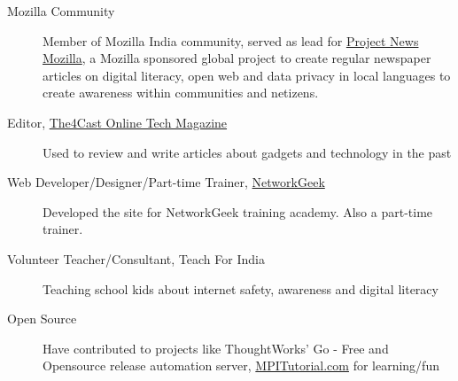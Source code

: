 \documentclass[letterpaper,11pt]{article}
\begin{document}
	\begin{description}
		\item[Mozilla Community] {\footnotesize Member of Mozilla India community, served as lead for \href{https://wiki.mozilla.org/NeMo}{Project News Mozilla}, a Mozilla sponsored global project to create regular newspaper articles on digital literacy, open web and data privacy in local languages to create awareness within communities and netizens. }
		\item[Editor, \href{http://www.the4cast.com/author/dwarak}{The4Cast Online Tech Magazine}] {\footnotesize Used to review and write articles about gadgets and technology in the past}
		\item[Web Developer/Designer/Part-time Trainer, \href{https://www.networkgeek.in/}{NetworkGeek}] {\footnotesize Developed the site for NetworkGeek training academy. Also a part-time trainer.}
		\item[Volunteer Teacher/Consultant, Teach For India]{\footnotesize Teaching school kids about internet safety, awareness and digital literacy}
		\item[Open Source] {\footnotesize{ Have contributed to projects like ThoughtWorks' Go - Free and  Opensource release automation server, \href{https://mpitutorial.com/about/}{MPITutorial.com} for learning/fun}}
	\end{description}
\end{document}
